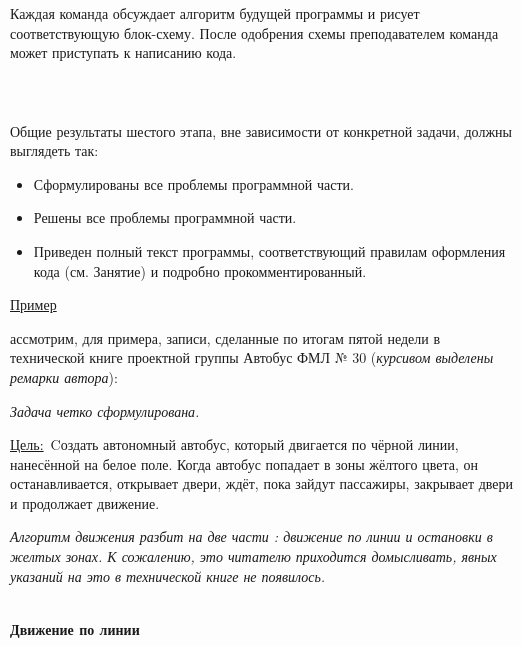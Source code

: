 Каждая команда обсуждает алгоритм будущей программы и рисует соответствующую блок-схему. После одобрения схемы преподавателем команда может приступать к написанию кода.\\\\

{\hypertarget{lesson28x4}{}}\\\\

Общие результаты шестого этапа, вне зависимости от конкретной задачи, должны выглядеть так:

\begin{itemize}
	\item Сформулированы  все проблемы программной части.
	\item Решены  все  проблемы программной части.
	\item Приведен полный текст программы, соответствующий правилам оформления кода (см. Занятие) и подробно прокомментированный.
\end{itemize}

\noindent\underline{Пример}

ассмотрим, для примера, записи, сделанные по итогам пятой недели в технической книге проектной группы Автобус ФМЛ № 30 ({\slshape курсивом выделены ремарки автора}): 

{\slshape Задача четко сформулирована.}

\noindent\underline{Цель:}~Cоздать автономный автобус, который двигается по чёрной линии, нанесённой на белое поле. Когда автобус попадает в зоны жёлтого цвета, он останавливается, открывает двери, ждёт, пока зайдут пассажиры, закрывает двери и продолжает движение.

{\slshape Алгоритм движения разбит на две части : движение по линии и остановки в желтых зонах. К сожалению, это читателю приходится домысливать, явных указаний на это в технической книге не появилось.}\\\\

\begin{center}
	{\bfseries Движение по линии}
\end{center}

